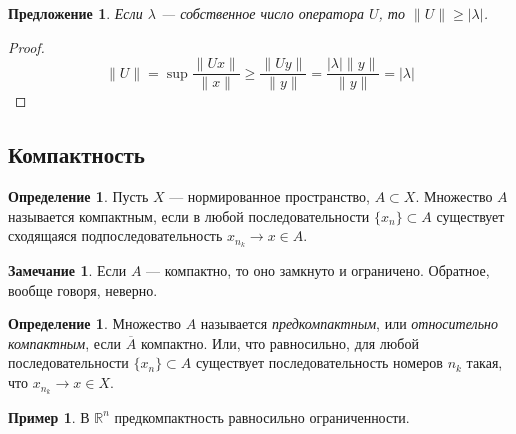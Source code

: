 \documentclass[11pt,openany,a4paper]{scrartcl}
\theoremstyle{plain}
\newtheorem{proposition}[theorem]{Предложение}
\theoremstyle{definition}
\newtheorem{definition}[theorem]{Определение}
\newtheorem{remark}[theorem]{Замечание}
\newtheorem{example}[theorem]{Пример}
\newcommand\mb{\mathbb}
\newcommand\real{\mb R}
\newcommand\ol{\overline}
\begin{document}
\begin{proposition}
    Если $\lambda$ — собственное число оператора $U$, то
    $\|U\| \geqslant |\lambda|$.
\end{proposition}
\begin{proof}
    $$
    \|U\| = \sup \frac{\|Ux\|}{\|x\|} \geqslant \frac{\|Uy\|}{\|y\|} =
    \frac{|\lambda|\|y\|}{\|y\|} = |\lambda|
    $$
\end{proof}

\subsection{Компактность}

\begin{definition}
    Пусть $X$ — нормированное пространство, $A\subset X$. Множество $A$ называется 
    компактным, если в любой последовательности $\{x_n\} \subset A$ существует сходящаяся
    подпоследовательность $x_{n_k} \to x \in A$.
\end{definition}
\begin{remark}
    Если $A$ — компактно, то оно замкнуто и ограничено. Обратное, вообще говоря, неверно.
\end{remark}
\begin{definition}
    Множество $A$ называется \emph{предкомпактным}, или \emph{относительно компактным}, если
    $\ol A$ компактно. Или, что равносильно, для любой последовательности $\{x_n\} \subset A$
    существует последовательность номеров $n_k$ такая, что $x_{n_k} \to x \in X$.
\end{definition}

\begin{example}
    В $\real^n$ предкомпактность равносильно ограниченности.
\end{example}
\end{document}
